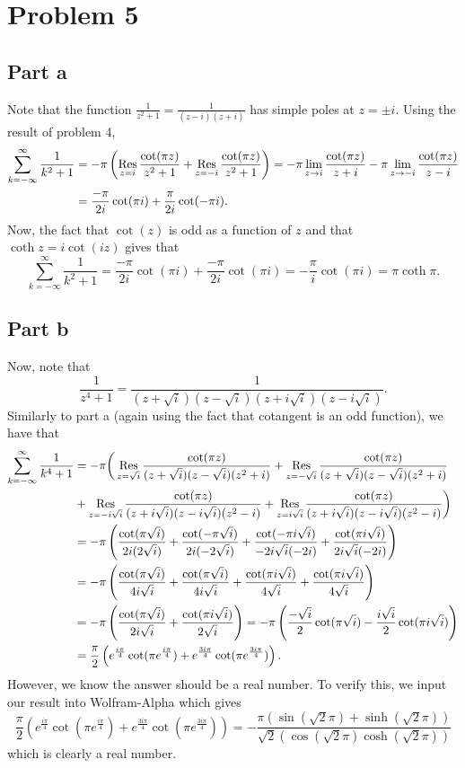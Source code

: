 \documentclass{article}
\begin{document}
\section{Problem 5}
\subsection{Part a}
Note that the function $\frac{1}{z^2+1}=\frac{1}{(z-i)(z+i)}$ has simple poles at $z=\pm i$. Using the result of problem 4,
\begin{align*}
\sum_{k=-\infty}^\infty \frac{1}{k^2+1}&=-\pi\left(\operatorname*{Res}_{z=i}\frac{\cot(\pi z)}{z^2+1}+\operatorname*{Res}_{z=-i}\frac{\cot(\pi z)}{z^2+1}\right)=-\pi\lim_{z\to i}\frac{\cot(\pi z)}{z+i}-\pi\lim_{z\to -i}\frac{\cot(\pi z)}{z-i}\\&=
\frac{-\pi}{2i}\cot(\pi i)+\frac{\pi}{2i}\cot(-\pi i).
\end{align*}
Now, the fact that $\cot(z)$ is odd as a function of $z$ and that $\coth{z}=i\cot(iz)$ gives that
\[
\sum_{k=-\infty}^\infty \frac{1}{k^2+1}=\frac{-\pi}{2i}\cot(\pi i)+\frac{-\pi}{2i}\cot(\pi i)=-\frac{\pi}{i}\cot(\pi i)=\pi\coth\pi.
\]
\subsection{Part b}
Now, note that 
\[
\frac{1}{z^4+1}=\frac{1}{(z+\sqrt i)(z-\sqrt{i})(z+i\sqrt i)(z-i\sqrt{i})}.
\]
Similarly to part a (again using the fact that cotangent is an odd function), we have that
\begin{align*}
\sum_{k=-\infty}^\infty \frac{1}{k^4+1}&=-\pi\biggr(\operatorname*{Res}_{z=\sqrt i}\frac{\cot(\pi z)}{(z+\sqrt i)(z-\sqrt{i})(z^2+i)}+\operatorname*{Res}_{z=-\sqrt i}\frac{\cot(\pi z)}{(z+\sqrt i)(z-\sqrt{i})(z^2+i)}\\&+
\operatorname*{Res}_{z=-i\sqrt i}\frac{\cot(\pi z)}{(z+i\sqrt i)(z-i\sqrt{i})(z^2-i)}+\operatorname*{Res}_{z=i\sqrt i}\frac{\cot(\pi z)}{(z+i\sqrt i)(z-i\sqrt{i})(z^2-i)}\biggr)\\&=
-\pi\left(\frac{\cot(\pi\sqrt{i})}{2i(2\sqrt{i})}+\frac{\cot(-\pi\sqrt{i})}{2i(-2\sqrt{i})}+\frac{\cot(-\pi i\sqrt{i})}{-2i\sqrt{i}(-2i)}+\frac{\cot(\pi i\sqrt{i})}{2i\sqrt{i}(-2i)}\right)\\&=
-\pi\left(\frac{\cot(\pi\sqrt{i})}{4i\sqrt{i}}+\frac{\cot(\pi\sqrt{i})}{4i\sqrt{i}}+\frac{\cot(\pi i\sqrt{i})}{4\sqrt{i}}+\frac{\cot(\pi i\sqrt{i})}{4\sqrt{i}}\right)\\&=
-\pi\left(\frac{\cot(\pi\sqrt{i})}{2i\sqrt{i}}+\frac{\cot(\pi i\sqrt{i})}{2\sqrt{i}}\right)=-\pi\left(\frac{-\sqrt{i}}{2}\cot(\pi\sqrt{i})-\frac{i\sqrt{i}}{2}\cot(\pi i\sqrt{i})\right)\\&=
\frac{\pi}{2}\left(e^{\frac{i\pi}{4}}\cot(\pi e^{\frac{i\pi}{4}})+e^{\frac{3i\pi}{4}}\cot(\pi e^{\frac{3i\pi}{4}})\right).
\end{align*}
However, we know the answer should be a real number. To verify this, we input our result into Wolfram-Alpha which gives
\[
\frac{\pi}{2}\left(e^{\frac{i\pi}{4}}\cot(\pi e^{\frac{i\pi}{4}})+e^{\frac{3i\pi}{4}}\cot(\pi e^{\frac{3i\pi}{4}})\right)=-\frac{\pi(\sin(\sqrt{2}\pi)+\sinh(\sqrt{2}\pi))}{\sqrt{2}(\cos(\sqrt{2}\pi)\cosh(\sqrt{2}\pi))}
\]
which is clearly a real number. 
\end{document}
